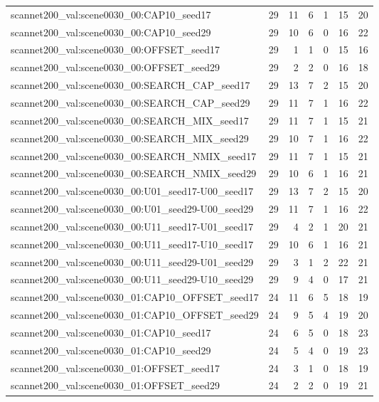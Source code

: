 \begin{table}[t]
\begin{tabular}{lrrrrrr}
scannet200\_val:scene0030\_00:CAP10\_seed17 & 29 & 11 & 6 & 1 & 15 & 20 \\
scannet200\_val:scene0030\_00:CAP10\_seed29 & 29 & 10 & 6 & 0 & 16 & 22 \\
scannet200\_val:scene0030\_00:OFFSET\_seed17 & 29 & 1 & 1 & 0 & 15 & 16 \\
scannet200\_val:scene0030\_00:OFFSET\_seed29 & 29 & 2 & 2 & 0 & 16 & 18 \\
scannet200\_val:scene0030\_00:SEARCH\_CAP\_seed17 & 29 & 13 & 7 & 2 & 15 & 20 \\
scannet200\_val:scene0030\_00:SEARCH\_CAP\_seed29 & 29 & 11 & 7 & 1 & 16 & 22 \\
scannet200\_val:scene0030\_00:SEARCH\_MIX\_seed17 & 29 & 11 & 7 & 1 & 15 & 21 \\
scannet200\_val:scene0030\_00:SEARCH\_MIX\_seed29 & 29 & 10 & 7 & 1 & 16 & 22 \\
scannet200\_val:scene0030\_00:SEARCH\_NMIX\_seed17 & 29 & 11 & 7 & 1 & 15 & 21 \\
scannet200\_val:scene0030\_00:SEARCH\_NMIX\_seed29 & 29 & 10 & 6 & 1 & 16 & 21 \\
scannet200\_val:scene0030\_00:U01\_seed17-U00\_seed17 & 29 & 13 & 7 & 2 & 15 & 20 \\
scannet200\_val:scene0030\_00:U01\_seed29-U00\_seed29 & 29 & 11 & 7 & 1 & 16 & 22 \\
scannet200\_val:scene0030\_00:U11\_seed17-U01\_seed17 & 29 & 4 & 2 & 1 & 20 & 21 \\
scannet200\_val:scene0030\_00:U11\_seed17-U10\_seed17 & 29 & 10 & 6 & 1 & 16 & 21 \\
scannet200\_val:scene0030\_00:U11\_seed29-U01\_seed29 & 29 & 3 & 1 & 2 & 22 & 21 \\
scannet200\_val:scene0030\_00:U11\_seed29-U10\_seed29 & 29 & 9 & 4 & 0 & 17 & 21 \\
scannet200\_val:scene0030\_01:CAP10\_OFFSET\_seed17 & 24 & 11 & 6 & 5 & 18 & 19 \\
scannet200\_val:scene0030\_01:CAP10\_OFFSET\_seed29 & 24 & 9 & 5 & 4 & 19 & 20 \\
scannet200\_val:scene0030\_01:CAP10\_seed17 & 24 & 6 & 5 & 0 & 18 & 23 \\
scannet200\_val:scene0030\_01:CAP10\_seed29 & 24 & 5 & 4 & 0 & 19 & 23 \\
scannet200\_val:scene0030\_01:OFFSET\_seed17 & 24 & 3 & 1 & 0 & 18 & 19 \\
scannet200\_val:scene0030\_01:OFFSET\_seed29 & 24 & 2 & 2 & 0 & 19 & 21 \\

\end{tabular}
\end{table}
